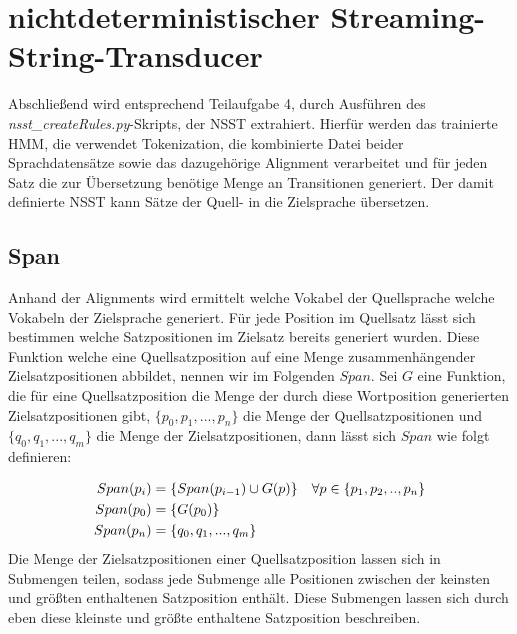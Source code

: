 \documentclass[conference]{IEEEtran}
\begin{document}
\section{nichtdeterministischer Streaming-String-Transducer}
Abschließend wird entsprechend Teilaufgabe 4, durch Ausführen des \textit{nsst\_createRules.py}-Skripts, der NSST extrahiert.
Hierfür werden das trainierte HMM, die verwendet Tokenization, die kombinierte Datei beider Sprachdatensätze sowie das dazugehörige Alignment verarbeitet und für jeden Satz die zur Übersetzung benötige Menge an Transitionen generiert.
Der damit definierte NSST kann Sätze der Quell- in die Zielsprache übersetzen.

\subsection{Span}
Anhand der Alignments wird ermittelt welche Vokabel der Quellsprache welche 
Vokabeln der Zielsprache generiert. 
Für jede Position im Quellsatz lässt sich bestimmen welche Satzpositionen im Zielsatz bereits generiert wurden. 
Diese Funktion welche eine Quellsatzposition auf eine Menge zusammenhängender Zielsatzpositionen abbildet, nennen wir im Folgenden $Span$.
Sei $G$ eine Funktion, die für eine Quellsatzposition die Menge der durch diese Wortposition generierten Zielsatzpositionen gibt, $\{p_0, p_1,..., p_n\}$ die Menge der Quellsatzpositionen und $\{q_0, q_1,..., q_m\}$ die Menge der Zielsatzpositionen, dann lässt sich  $Span$ wie folgt definieren:

\begin{equation}\notag
    \begin{aligned}
        Span(p_i) &= \{Span(p_{i-1}) \cup G(p)\} && \forall p \in \{p_1, p_2, .. , p_n\}\\
        Span(p_0) &= \{G(p_0)\}\\
        Span(p_n) &= \{q_0, q_1, ... , q_m\}
    \end{aligned}
\end{equation}
Die Menge der Zielsatzpositionen einer Quellsatzposition lassen sich in Submengen teilen, sodass jede Submenge alle Positionen zwischen der keinsten und größten enthaltenen Satzposition enthält. Diese Submengen lassen sich durch eben diese kleinste und größte enthaltene Satzposition beschreiben.
\end{document}
